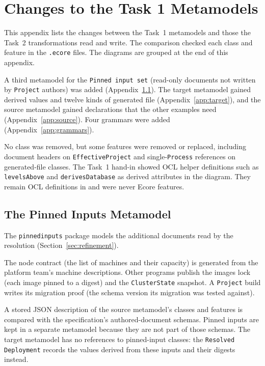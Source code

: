 \section{Changes to the Task 1 Metamodels}
\label{app:metamodels}

This appendix lists the changes between the Task~1 metamodels and those the
Task~2 transformations read and write. The comparison checked each class and
feature in the \texttt{.ecore} files. The diagrams are grouped at the end
of this appendix.

A third metamodel for the \texttt{Pinned input set} (read-only documents not written by \texttt{Project} authors) was added
(Appendix~\ref{app:pinned}). The target metamodel gained derived values and
twelve kinds of generated file (Appendix~\ref{app:target}), and the source
metamodel gained declarations that the other examples need
(Appendix~\ref{app:source}). Four grammars were added
(Appendix~\ref{app:grammars}).

No class was removed, but some features were removed or replaced, including
document headers on \texttt{EffectiveProject} and single-\texttt{Process}
references on generated-file classes. The Task~1 hand-in showed OCL helper definitions such as
\texttt{levelsAbove} and \texttt{derivesDatabase} as derived attributes in the
diagram. They remain OCL definitions in  and were
never Ecore features.

\subsection{The Pinned Inputs Metamodel}
\label{app:pinned}

The \texttt{pinnedinputs} package models the additional documents read by
the resolution (Section~\ref{sec:refinement}).

The node contract (the list of machines and their capacity) is generated from the platform team's machine descriptions. Other programs publish the images lock (each image pinned to a digest) and the \texttt{ClusterState} snapshot. A \texttt{Project} build writes its migration proof (the schema
version its migration was tested against).

A stored JSON description of the source metamodel's classes and features is
compared with the specification's authored-document schemas. Pinned inputs are kept in a
separate metamodel because they are not part of those schemas. The target
metamodel has no references to pinned-input classes: the
\texttt{Resolved Deployment} records the values derived from these inputs
and their digests instead.

